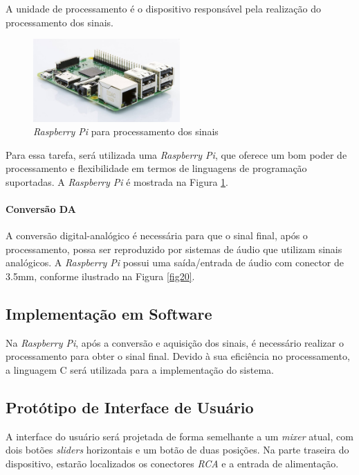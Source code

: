 A unidade de processamento é o dispositivo responsável pela realização do processamento dos sinais. 

\begin{figure}[h]
    \centering
    \includegraphics[width=0.5\textwidth]{figuras/fig65.jpg}
    \caption{\textit{Raspberry Pi} para processamento dos sinais \cite{adrenalineDisplaysLanar}}
    \label{fig65}
\end{figure}

Para essa tarefa, será utilizada uma \textit{Raspberry Pi}, que oferece um bom poder de processamento e flexibilidade em termos de linguagens de programação suportadas. A \textit{Raspberry Pi} é mostrada na Figura \ref{fig65}.

\paragraph{Conversão DA}

A conversão digital-analógico é necessária para que o sinal final, após o processamento, possa ser reproduzido por sistemas de áudio que utilizam sinais analógicos. A \textit{Raspberry Pi} possui uma saída/entrada de áudio com conector de 3.5mm, conforme ilustrado na Figura \ref{fig20}.

\subsection{Implementação em Software}

Na \textit{Raspberry Pi}, após a conversão e aquisição dos sinais, é necessário realizar o processamento para obter o sinal final. Devido à sua eficiência no processamento, a linguagem C será utilizada para a implementação do sistema.

\subsection{Protótipo de Interface de Usuário}

A interface do usuário será projetada de forma semelhante a um \textit{mixer} atual, com dois botões \textit{sliders} horizontais e um botão de duas posições. Na parte traseira do dispositivo, estarão localizados os conectores \textit{RCA} e a entrada de alimentação.
